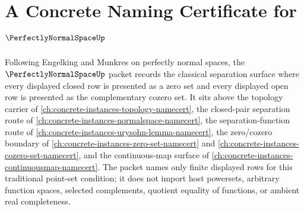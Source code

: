 \chapter{A Concrete Naming Certificate for $\PerfectlyNormalSpaceUp$}
\label{ch:concrete-instances-perfectly-normal-space-namecert}

Following Engelking and Munkres on perfectly normal spaces, the $\PerfectlyNormalSpaceUp$ packet records the classical separation surface where every displayed closed row is presented as a zero set and every displayed open row is presented as the complementary cozero set. It sits above the topology carrier of \autoref{ch:concrete-instances-topology-namecert}, the closed-pair separation route of \autoref{ch:concrete-instances-normalspace-namecert}, the separation-function route of \autoref{ch:concrete-instances-urysohn-lemma-namecert}, the zero/cozero boundary of \autoref{ch:concrete-instances-zero-set-namecert} and \autoref{ch:concrete-instances-cozero-set-namecert}, and the continuous-map surface of \autoref{ch:concrete-instances-continuousmap-namecert}. The packet names only finite displayed rows for this traditional point-set condition; it does not import host powersets, arbitrary function spaces, selected complements, quotient equality of functions, or ambient real completeness.

